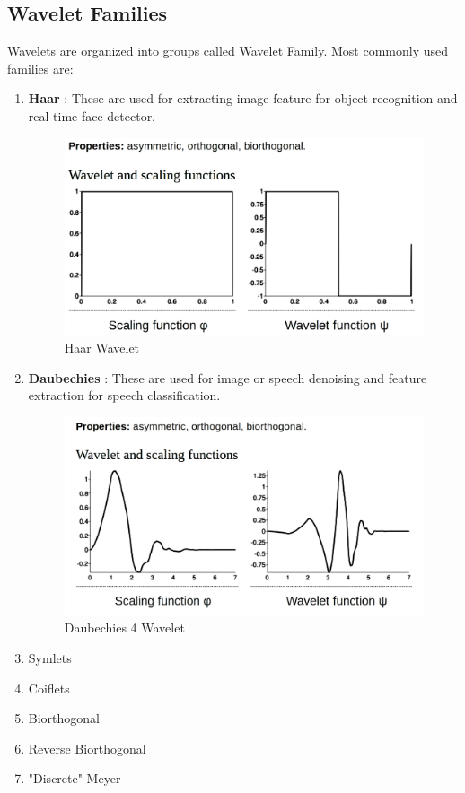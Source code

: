 \documentclass[11pt]{report}
\begin{document}
\subsection{Wavelet Families}
Wavelets are organized into groups called Wavelet Family. Most commonly used families are:
\begin{enumerate}
\item \textbf{Haar }: These are used for extracting image feature for object recognition and real-time face detector.\begin{figure}[h]
\centering
\includegraphics[scale=.25]{./images/haar.png}
\caption{Haar  Wavelet}
\end{figure}
\item \textbf{Daubechies }: These are used for image or speech denoising and feature extraction for speech classification. \begin{figure}[h]
\centering
\includegraphics[scale=.3]{./images/db4.png}
\caption{Daubechies 4 Wavelet}
\end{figure}

\item Symlets
\item Coiflets
\item Biorthogonal




\item Reverse Biorthogonal
\item "Discrete" Meyer
\end{enumerate}
\end{document}
